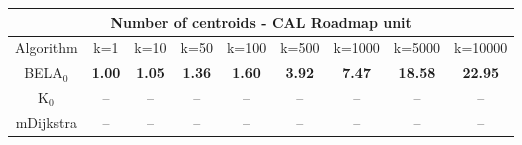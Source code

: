 \begin{tabular}{c|cccccccc}\toprule
\multicolumn{9}{c}{Number of centroids - CAL Roadmap unit}\\ \midrule
Algorithm & k=1 & k=10 & k=50 & k=100 & k=500 & k=1000 & k=5000 & k=10000 \\ \midrule
BELA$_0$ & \textbf{1.00} & \textbf{1.05} & \textbf{1.36} & \textbf{1.60} & \textbf{3.92} & \textbf{7.47} & \textbf{18.58} & \textbf{22.95} \\
K$_0$ & -- & -- & -- & -- & -- & -- & -- & -- \\
mDijkstra & -- & -- & -- & -- & -- & -- & -- & -- \\ \bottomrule 
\end{tabular}
